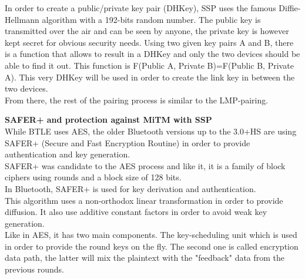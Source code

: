 In order to create a public/private key pair (DHKey), SSP uses the famous Diffie-Hellmann algorithm with a 192-bits random number. The public key is transmitted over the air and can be seen by anyone, the private key is however kept secret for obvious security needs. 
Using two given key pairs A and B, there is a function that allows to result in a DHKey and only the two devices should be able to find it out. This function is F(Public A, Private B)=F(Public B, Private A). This very DHKey will be used in order to create the link key in between the two devices. \\ 
From there, the rest of the pairing process is similar to the LMP-pairing.

\newpage
\textbf{SAFER+ and protection against MiTM with SSP}\\

While BTLE uses AES, the older Bluetooth versions up to the 3.0+HS are using SAFER+ (Secure and Fast Encryption Routine) in order to provide authentication and key generation.\\
SAFER+ was candidate to the AES process and like it, it is a family of block ciphers using rounds and a block size of 128 bits.\\
In Bluetooth, SAFER+ is used for key derivation and authentication.\\
This algorithm uses a non-orthodox linear transformation in order to provide diffusion. It also use additive constant factors in order to avoid weak key generation.\\
Like in AES, it has two main components. The key-scheduling unit which is used in order to provide the round keys on the fly. The second one is called encryption data path, the latter will mix the plaintext with the "feedback" data from the previous rounds.\\

